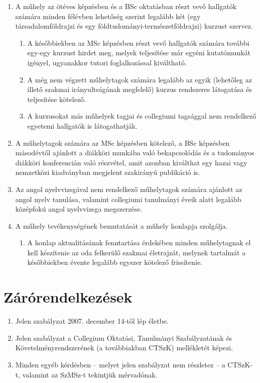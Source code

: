 \documentclass{../styles/rulebook}
\begin{document}
\begin{enumerate}
\begin{enumerate}
	\end{enumerate}
	\item A műhely az ötéves képzésben és a BSc oktatásban részt vevő hallgatók számára minden félévben lehetőség szerint legalább két (egy társadalomföldrajzi és egy földtudományi-természetföldrajzi) kurzust szervez. 
	\begin{enumerate}
		\item A későbbiekben az MSc képzésben részt vevő hallgatók számára további egy-egy kurzust hirdet meg, melyek teljesítése már egyéni kutatómunkát igényel, ugyanakkor tutori foglalkozással kiváltható.
		\item A még nem végzett műhelytagok számára legalább az egyik (lehetőleg az illető szakmai irányultságának megfelelő) kurzus rendszeres látogatása és teljesítése kötelező.
		\item  A kurzusokat más műhelyek tagjai és collegiumi tagsággal nem rendelkező egyetemi hallgatók is látogathatják.
	\end{enumerate} 
	\item A műhelytagok számára az MSc képzésben kötelező, a BSc képzésben másodévtől ajánlott a diákköri munkába való bekapcsolódás és a tudományos diákköri konferencián való részvétel, amit azonban kiválthat egy hazai vagy nemzetközi kiadványban megjelent szakirányú publikáció is.
	\item Az angol nyelvvizsgával nem rendelkező műhelytagok számára ajánlott az angol nyelv tanulása, valamint collegiumi tanulmányi éveik alatt legalább középfokú angol nyelvvizsga megszerzése.
	\item A műhely tevékenységének bemutatását a műhely honlapja szolgálja. 
	\begin{enumerate}
		\item A honlap aktualitásának fenntartása érdekében minden műhelytagnak el kell készítenie az oda felkerülő szakmai életrajzát, melynek tartalmát a későbbiekben évente legalább egyszer kötelező frissítenie.
	\end{enumerate}
	
\end{enumerate}


\section{Zárórendelkezések}

\begin{enumerate}
	\item Jelen szabályzat 2007. december 14-től lép életbe.
	\item Jelen szabályzat a Collegium Oktatási, Tanulmányi Szabályzatának és Követelményrendszerének (a továbbiakban CTSzK) mellékletét képezi.
	\item Minden egyéb kérdésben -- melyet jelen szabályzat nem részletez -- a CTSzK-t, valamint az SzMSz-t tekintjük mérvadónak.
\end{enumerate}
\end{document}
